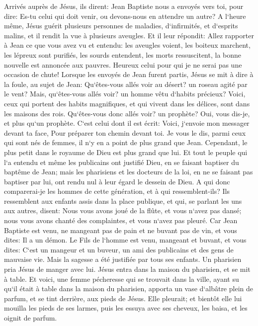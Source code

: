 \verse Arrivés auprès de Jésus, ils dirent: Jean Baptiste nous a envoyés vers toi, pour dire: Es-tu celui qui doit venir, ou devons-nous en attendre un autre? 
\verse A l`heure même, Jésus guérit plusieurs personnes de maladies, d`infirmités, et d`esprits malins, et il rendit la vue à plusieurs aveugles. 
\verse Et il leur répondit: Allez rapporter à Jean ce que vous avez vu et entendu: les aveugles voient, les boiteux marchent, les lépreux sont purifiés, les sourds entendent, les morts ressuscitent, la bonne nouvelle est annoncée aux pauvres. 
\verse Heureux celui pour qui je ne serai pas une occasion de chute! 
\verse Lorsque les envoyés de Jean furent partis, Jésus se mit à dire à la foule, au sujet de Jean: Qu`êtes-vous allés voir au désert? un roseau agité par le vent? 
\verse Mais, qu`êtes-vous allés voir? un homme vêtu d`habits précieux? Voici, ceux qui portent des habits magnifiques, et qui vivent dans les délices, sont dans les maisons des rois. 
\verse Qu`êtes-vous donc allés voir? un prophète? Oui, vous dis-je, et plus qu`un prophète. 
\verse C`est celui dont il est écrit: Voici, j`envoie mon messager devant ta face, Pour préparer ton chemin devant toi. 
\verse Je vous le dis, parmi ceux qui sont nés de femmes, il n`y en a point de plus grand que Jean. Cependant, le plus petit dans le royaume de Dieu est plus grand que lui. 
\verse Et tout le peuple qui l`a entendu et même les publicains ont justifié Dieu, en se faisant baptiser du baptême de Jean; 
\verse mais les pharisiens et les docteurs de la loi, en ne se faisant pas baptiser par lui, ont rendu nul à leur égard le dessein de Dieu. 
\verse A qui donc comparerai-je les hommes de cette génération, et à qui ressemblent-ils? 
\verse Ils ressemblent aux enfants assis dans la place publique, et qui, se parlant les uns aux autres, disent: Nous vous avons joué de la flûte, et vous n`avez pas dansé; nous vous avons chanté des complaintes, et vous n`avez pas pleuré. 
\verse Car Jean Baptiste est venu, ne mangeant pas de pain et ne buvant pas de vin, et vous dites: Il a un démon. 
\verse Le Fils de l`homme est venu, mangeant et buvant, et vous dites: C`est un mangeur et un buveur, un ami des publicains et des gens de mauvaise vie. 
\verse Mais la sagesse a été justifiée par tous ses enfants. 
\verse Un pharisien pria Jésus de manger avec lui. Jésus entra dans la maison du pharisien, et se mit à table. 
\verse Et voici, une femme pécheresse qui se trouvait dans la ville, ayant su qu`il était à table dans la maison du pharisien, apporta un vase d`albâtre plein de parfum, 
\verse et se tint derrière, aux pieds de Jésus. Elle pleurait; et bientôt elle lui mouilla les pieds de ses larmes, puis les essuya avec ses cheveux, les baisa, et les oignit de parfum. 
